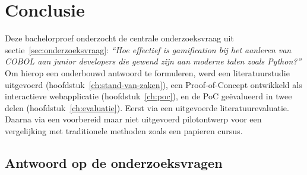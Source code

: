 
\chapter{Conclusie}%
\label{ch:conclusie}

Deze bachelorproef onderzocht de centrale onderzoeksvraag uit sectie~\ref{sec:onderzoeksvraag}: \textit{``Hoe effectief is gamification bij het aanleren van COBOL aan junior developers die gewend zijn aan moderne talen zoals Python?''}
Om hierop een onderbouwd antwoord te formuleren, werd een literatuurstudie uitgevoerd (hoofdstuk~\ref{ch:stand-van-zaken}), een Proof-of-Concept ontwikkeld als interactieve webapplicatie (hoofdstuk~\ref{ch:poc}), en de PoC geëvalueerd in twee delen (hoofdstuk~\ref{ch:evaluatie}). Eerst via een uitgevoerde literatuurevaluatie. Daarna via een voorbereid maar niet uitgevoerd pilotontwerp voor een vergelijking met traditionele methoden zoals een papieren cursus.

\section{Antwoord op de onderzoeksvragen}

